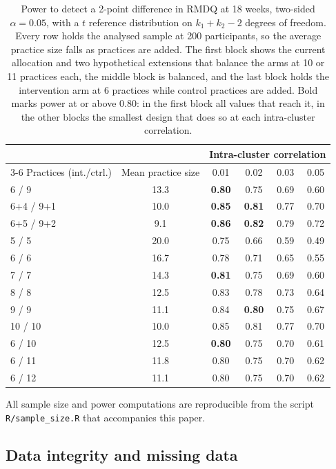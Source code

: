 \documentclass[11pt,a4paper]{article}
\begin{document}
\begin{table}[ht]
\centering\small
\caption{Power to detect a 2-point difference in RMDQ at 18 weeks, two-sided
$\alpha = 0.05$, with a $t$ reference distribution on $k_1+k_2-2$ degrees of
freedom. Every row holds the analysed sample at 200 participants, so the
average practice size falls as practices are added. The first block shows
the current allocation and two hypothetical extensions that balance the arms
at 10 or 11 practices each, the middle block is balanced, and the last block
holds the intervention arm at 6 practices while control practices are added. Bold marks
power at or above 0.80: in the first block all values that reach it, in the
other blocks the smallest design that does so at each intra-cluster
correlation.}
\label{tab:power}
\begin{tabular}{lccccc}
\toprule
& & \multicolumn{4}{c}{Intra-cluster correlation}\\
\cmidrule(l){3-6}
Practices (int./ctrl.) & Mean practice size & 0.01 & 0.02 & 0.03 & 0.05\\
\midrule
6 / 9   & 13.3 & \textbf{0.80} & 0.75 & 0.69 & 0.60\\
6+4 / 9+1 & 10.0 & \textbf{0.85} & \textbf{0.81} & 0.77 & 0.70\\
6+5 / 9+2 & 9.1  & \textbf{0.86} & \textbf{0.82} & 0.79 & 0.72\\
\midrule
5 / 5   & 20.0 & 0.75 & 0.66 & 0.59 & 0.49\\
6 / 6   & 16.7 & 0.78 & 0.71 & 0.65 & 0.55\\
7 / 7   & 14.3 & \textbf{0.81} & 0.75 & 0.69 & 0.60\\
8 / 8   & 12.5 & 0.83 & 0.78 & 0.73 & 0.64\\
9 / 9   & 11.1 & 0.84 & \textbf{0.80} & 0.75 & 0.67\\
10 / 10 & 10.0 & 0.85 & 0.81 & 0.77 & 0.70\\
\midrule
6 / 10  & 12.5 & \textbf{0.80} & 0.75 & 0.70 & 0.61\\
6 / 11  & 11.8 & 0.80 & 0.75 & 0.70 & 0.62\\
6 / 12  & 11.1 & 0.80 & 0.75 & 0.70 & 0.62\\
\bottomrule
\end{tabular}
\end{table}

All sample size and power computations are reproducible from the script
\texttt{R/sample\_size.R} that accompanies this paper.

\subsection{Data integrity and missing data}
\end{document}
